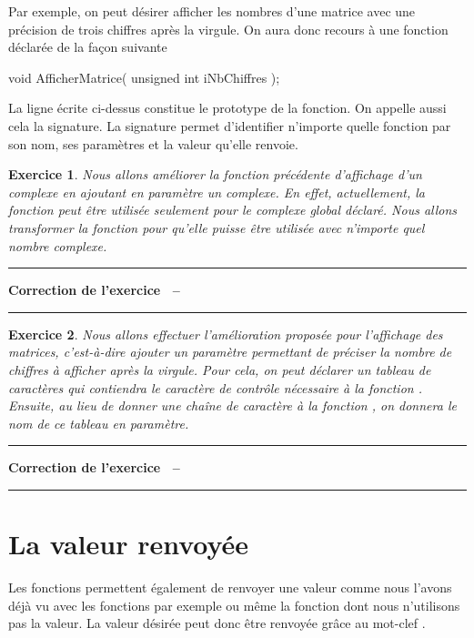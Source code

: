 \documentclass[a4paper]{article}
\newtheorem{Exo}{Exercice}
\newenvironment{Correction}{\par\tiny\blue\rule[1ex]{\textwidth}{1pt}\par\normalsize\textbf{Correction de l'exercice~\theExo{} -- }}{\par\tiny\blue\rule[1ex]{\textwidth}{1pt}\par}
\begin{document}
		Par exemple, on peut désirer afficher les nombres d'une matrice avec une précision de trois chiffres après la virgule.
		On aura donc recours à une fonction déclarée de la façon suivante
		\begin{Code*}
void AfficherMatrice( unsigned int iNbChiffres );
		\end{Code*}
		La ligne écrite ci-dessus constitue le prototype de la fonction.
		On appelle aussi cela la signature.
		La signature permet d'identifier n'importe quelle fonction par son nom, ses paramètres et la valeur qu'elle renvoie.
		\begin{Exo}
			Nous allons améliorer la fonction précédente d'affichage d'un complexe en ajoutant en paramètre un complexe.
			En effet, actuellement, la fonction peut être utilisée seulement pour le complexe global déclaré.
			Nous allons transformer la fonction pour qu'elle puisse être utilisée avec n'importe quel nombre complexe.
		\end{Exo}
		\begin{Correction}
		\end{Correction}
		\begin{Exo}
			Nous allons effectuer l'amélioration proposée pour l'affichage des matrices, c'est-à-dire ajouter un paramètre permettant de préciser la nombre de chiffres à afficher après la virgule.
			Pour cela, on peut déclarer un tableau de caractères qui contiendra le caractère de contrôle nécessaire à la fonction .
			Ensuite, au lieu de donner une chaîne de caractère à la fonction , on donnera le nom de ce tableau en paramètre.
		\end{Exo}
		\begin{Correction}
		\end{Correction}
	\section{La valeur renvoyée}
		Les fonctions permettent également de renvoyer une valeur comme nous l'avons déjà vu avec les fonctions   par exemple ou même la fonction  dont nous n'utilisons pas la valeur.
		La valeur désirée peut donc être renvoyée grâce au mot-clef .
\end{document}
